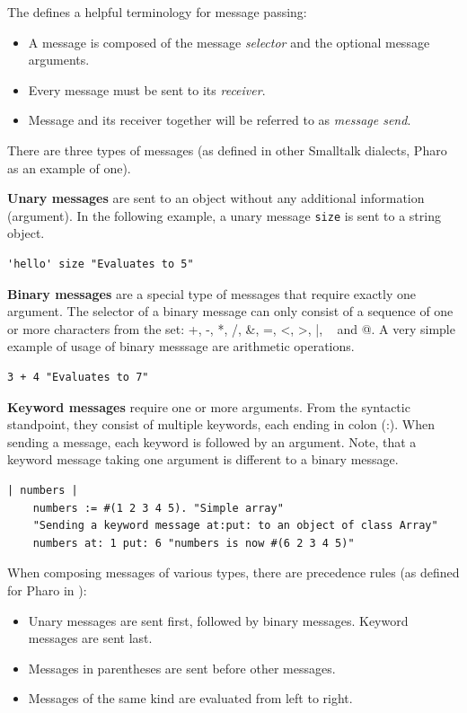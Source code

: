 \documentclass[thesis=M,english]{FITthesis}[2019/12/23]
\begin{document}
The \cite{pharo-by-example} defines a helpful terminology for message passing:
\begin{itemize}
	\item A message is composed of the message \textit{selector} and the optional message arguments.
	\item Every message must be sent to its \textit{receiver}.
	\item Message and its receiver together will be referred to as \textit{message send}.
\end{itemize}

There are three types of messages (as defined in other Smalltalk dialects, Pharo as an example of one).

\textbf{Unary messages} are sent to an object without any additional information (argument). In the following
example, a unary message \texttt{size} is sent to a string object.
\begin{lstlisting}[language=Smalltalk]
	'hello' size "Evaluates to 5"
\end{lstlisting}

\textbf{Binary messages} are a special type of messages that require exactly one argument. The selector
of a binary message can only consist of a sequence of one or more characters from the set: +, -, *, /,
\&, =, \textless, \textgreater, |, ~ and @. A very simple example of usage of binary messsage are arithmetic operations.
\begin{lstlisting}[language=Smalltalk]
	3 + 4 "Evaluates to 7"
\end{lstlisting}

\textbf{Keyword messages} require one or more arguments. From the syntactic standpoint, they consist of
multiple keywords, each ending in colon (:). When sending a message, each keyword is followed by an argument.
Note, that a keyword message taking one argument is different to a binary message.
\begin{lstlisting}[language=Smalltalk]
	| numbers |
	numbers := #(1 2 3 4 5). "Simple array"
	"Sending a keyword message at:put: to an object of class Array"
	numbers at: 1 put: 6 "numbers is now #(6 2 3 4 5)"
\end{lstlisting}

When composing messages of various types, there are precedence rules (as defined for Pharo in \cite{pharo-by-example}):
\begin{itemize}
	\item Unary messages are sent first, followed by binary messages. Keyword messages are sent last.
	\item Messages in parentheses are sent before other messages.
	\item Messages of the same kind are evaluated from left to right. 
\end{itemize}
\end{document}

